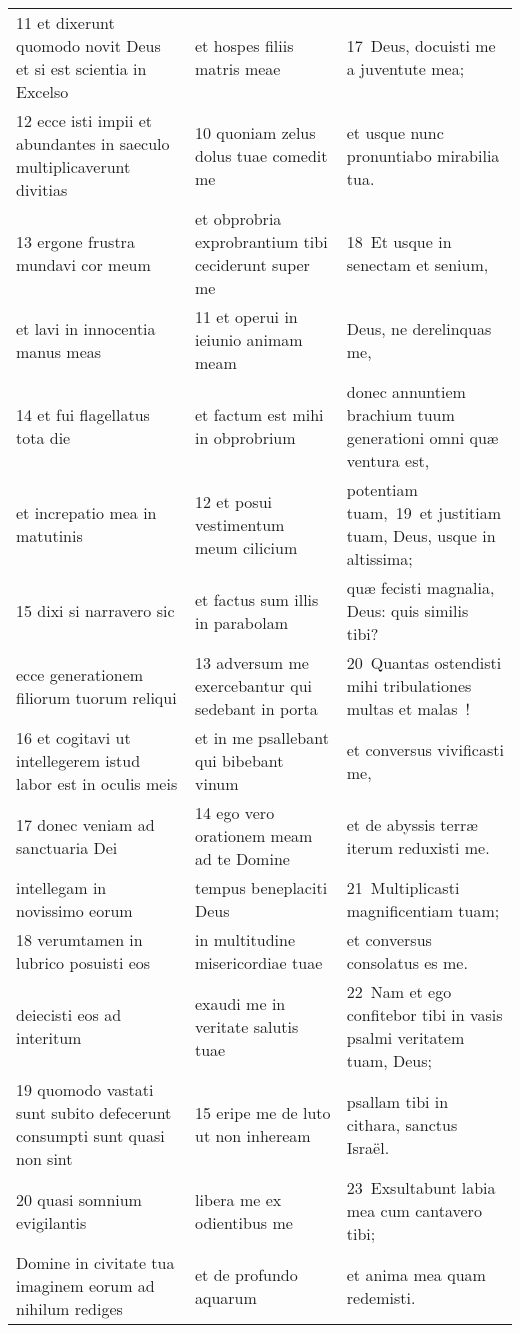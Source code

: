 \documentclass{article}
\begin{document}
\begin{longtable}{@{}p{}p{}p{}@{}}
11 et dixerunt quomodo novit Deus et si est scientia in Excelso	&	et hospes filiis matris meae	&	17 Deus, docuisti me a juventute mea;	\\
12 ecce isti impii et abundantes in saeculo multiplicaverunt divitias	&	10 quoniam zelus dolus tuae comedit me	&	et usque nunc pronuntiabo mirabilia tua.	\\
13 ergone frustra mundavi cor meum	&	et obprobria exprobrantium tibi ceciderunt super me	&	18 Et usque in senectam et senium,	\\
et lavi in innocentia manus meas	&	11 et operui in ieiunio animam meam	&	Deus, ne derelinquas me,	\\
14 et fui flagellatus tota die	&	et factum est mihi in obprobrium	&	donec annuntiem brachium tuum generationi omni quæ ventura est,	\\
et increpatio mea in matutinis	&	12 et posui vestimentum meum cilicium	&	potentiam tuam, 19 et justitiam tuam, Deus, usque in altissima;	\\
15 dixi si narravero sic	&	et factus sum illis in parabolam	&	quæ fecisti magnalia, Deus: quis similis tibi?	\\
ecce generationem filiorum tuorum reliqui	&	13 adversum me exercebantur qui sedebant in porta	&	20 Quantas ostendisti mihi tribulationes multas et malas !	\\
16 et cogitavi ut intellegerem istud labor est in oculis meis	&	et in me psallebant qui bibebant vinum	&	et conversus vivificasti me,	\\
17 donec veniam ad sanctuaria Dei	&	14 ego vero orationem meam ad te Domine	&	et de abyssis terræ iterum reduxisti me.	\\
intellegam in novissimo eorum	&	tempus beneplaciti Deus	&	21 Multiplicasti magnificentiam tuam;	\\
18 verumtamen in lubrico posuisti eos	&	in multitudine misericordiae tuae	&	et conversus consolatus es me.	\\
deiecisti eos ad interitum	&	exaudi me in veritate salutis tuae	&	22 Nam et ego confitebor tibi in vasis psalmi veritatem tuam, Deus;	\\
19 quomodo vastati sunt subito defecerunt consumpti sunt quasi non sint	&	15 eripe me de luto ut non inheream	&	psallam tibi in cithara, sanctus Israël.	\\
20 quasi somnium evigilantis	&	libera me ex odientibus me	&	23 Exsultabunt labia mea cum cantavero tibi;	\\
Domine in civitate tua imaginem eorum ad nihilum rediges	&	et de profundo aquarum	&	et anima mea quam redemisti.	\\

\end{longtable}
\end{document}
